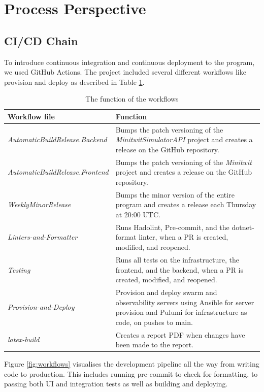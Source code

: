 \section{Process Perspective}

\subsection{CI/CD Chain}

To introduce continuous integration and continuous deployment to the program, we used GitHub Actions. The project included several different workflows like provision and deploy as described in Table \ref{tab:workflows}.

\begin{table}[H]
    \centering
    \begin{tabular}{|p{} | p{}|}
        \hline
        \textbf{Workflow file} & \textbf{Function}\\
        \hline
        \textit{AutomaticBuildRelease.Backend} &  Bumps the patch versioning of the \textit{MinitwitSimulatorAPI} project and creates a release on the GitHub repository.\\
        \textit{AutomaticBuildRelease.Frontend} & Bumps the patch versioning of the \textit{Minitwit} project and creates a release on the GitHub repository.\\
        \textit{WeeklyMinorRelease} & Bumps the minor version of the entire program and creates a release each Thursday at 20:00 UTC.\\
        \textit{Linters-and-Formatter} & Runs Hadolint, Pre-commit, and the dotnet-format linter, when a PR is created, modified, and reopened.\\
        \textit{Testing} & Runs all tests on the infrastructure, the frontend, and the backend, when a PR is created, modified, and reopened.\\
        \textit{Provision-and-Deploy} & Provision and deploy swarm and observability servers using Ansible for server provision and Pulumi for infrastructure as code, on pushes to main.\\
        \textit{latex-build} & Creates a report PDF when changes have been made to the report.\\
        \hline
    \end{tabular}
    \caption{The function of the workflows}
    \label{tab:workflows}
\end{table}

Figure \ref{fig:workflows} visualises the development pipeline all the way from writing code to production. This includes running pre-commit to check for formatting, to passing both UI and integration tests as well as building and deploying.

